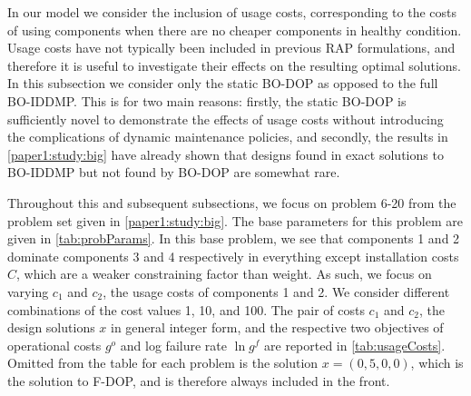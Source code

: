 \documentclass[11pt,authoryear,a4paper]{article}
\theoremstyle{definition}
\begin{document}
In our model we consider the inclusion of usage costs, corresponding to the costs of using components when there are no cheaper components in healthy condition. Usage costs have not typically been included in previous RAP formulations, and therefore it is useful to investigate their effects on the resulting optimal solutions. In this subsection we consider only the static BO-DOP as opposed to the full BO-IDDMP. This is for two main reasons: firstly, the static BO-DOP is sufficiently novel to demonstrate the effects of usage costs without introducing the complications of dynamic maintenance policies, and secondly, the results in \autoref{paper1:study:big} have already shown that designs found in exact solutions to BO-IDDMP but not found by BO-DOP are somewhat rare. 

Throughout this and subsequent subsections, we focus on problem 6-20 from the problem set given in \autoref{paper1:study:big}. The base parameters for this problem are given in \autoref{tab:probParams}. In this base problem, we see that components 1 and 2 dominate components 3 and 4 respectively in everything except installation costs $C$, which are a weaker constraining factor than weight. As such, we focus on varying $c_1$ and $c_2$, the usage costs of components 1 and 2. We consider different combinations of the cost values 1, 10, and 100. The pair of costs $c_1$ and $c_2$, the design solutions $x$ in general integer form, and the respective two objectives of operational costs $g^o$ and log failure rate $\ln g^f$ are reported in \autoref{tab:usageCosts}. Omitted from the table for each problem is the solution $x = (0,5,0,0)$, which is the solution to F-DOP, and is therefore always included in the front. 

\end{document}
